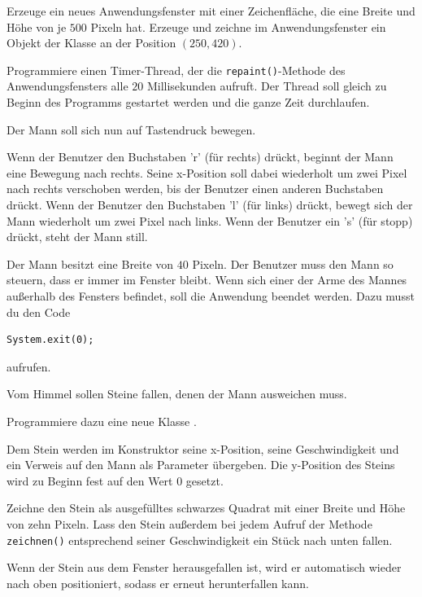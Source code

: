 \begin{compactenum}[a)]
\item Erzeuge ein neues Anwendungsfenster mit einer Zeichenfläche, die eine
Breite und Höhe von je $500$ Pixeln hat. Erzeuge und zeichne im Anwendungsfenster
ein Objekt der Klasse  an der Position $(250, 420)$.

\item Programmiere einen Timer-Thread, der die \lstinline|repaint()|-Methode des
Anwendungsfensters alle $20$ Millisekunden aufruft. Der Thread soll gleich zu
Beginn des Programms gestartet werden und die ganze Zeit durchlaufen.

\item Der Mann soll sich nun auf Tastendruck bewegen.

Wenn der Benutzer den Buchstaben 'r' (für rechts) drückt, beginnt der Mann eine
Bewegung nach rechts. Seine x-Position soll dabei wiederholt um zwei Pixel nach
rechts verschoben werden, bis der Benutzer einen anderen Buchstaben drückt.
Wenn der Benutzer den Buchstaben 'l' (für links) drückt, bewegt sich der Mann
wiederholt um zwei Pixel nach links. Wenn der Benutzer ein 's' (für stopp)
drückt, steht der Mann still.

\item Der Mann besitzt eine Breite von $40$ Pixeln. Der Benutzer muss den Mann so
steuern, dass er immer im Fenster bleibt. Wenn sich einer der Arme des Mannes
außerhalb des Fensters befindet, soll die Anwendung beendet werden. Dazu musst
du den Code

\begin{lstlisting}
System.exit(0);
\end{lstlisting}

aufrufen.

\item Vom Himmel sollen Steine fallen, denen der Mann ausweichen muss.

Programmiere dazu eine neue Klasse .

Dem Stein werden im Konstruktor seine x-Position, seine Geschwindigkeit und ein
Verweis auf den Mann als Parameter übergeben. Die y-Position des Steins wird zu
Beginn fest auf den Wert $0$ gesetzt.

Zeichne den Stein als ausgefülltes schwarzes Quadrat mit einer Breite und Höhe
von zehn Pixeln. Lass den Stein außerdem bei jedem Aufruf der Methode
\lstinline|zeichnen()| entsprechend seiner Geschwindigkeit ein Stück nach unten
fallen.

Wenn der Stein aus dem Fenster herausgefallen ist, wird er automatisch wieder
nach oben positioniert, sodass er erneut herunterfallen kann.


\end{compactenum}
